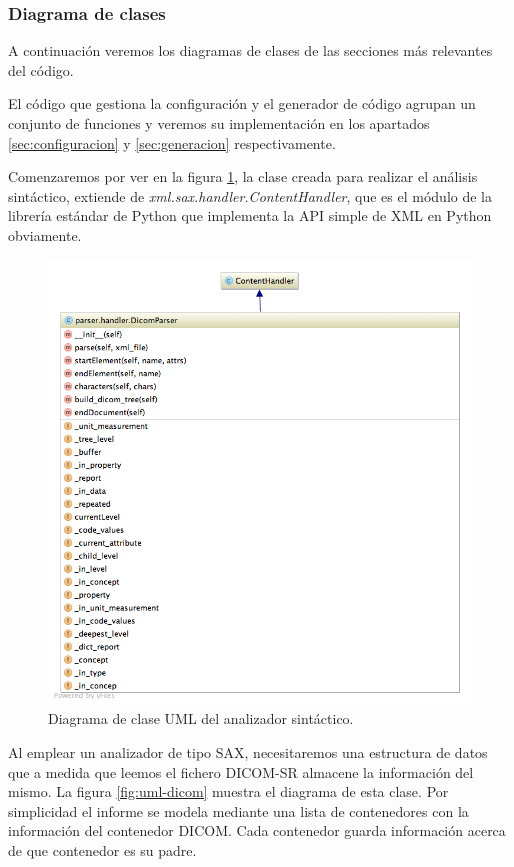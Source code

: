 \subsubsection{Diagrama de clases}
A continuación veremos los diagramas de clases de las secciones más relevantes del código.\par
El código que gestiona la configuración y el generador de código agrupan un conjunto de funciones y veremos su implementación en los apartados \ref{sec:configuracion} y \ref{sec:generacion} respectivamente.\par
Comenzaremos por ver en la figura \ref{fig:uml-parser}, la clase creada para realizar el análisis sintáctico, extiende de \emph{xml.sax.handler.ContentHandler}, que es el módulo de la librería estándar de Python que implementa la API simple de XML en Python obviamente. \par

\begin{figure}[ht]
\centering
\includegraphics[scale=0.6]{./imgs/diagramasUML/parser.png}
\caption{Diagrama de clase UML del analizador sintáctico.}
\label{fig:uml-parser}
\end{figure}

Al emplear un analizador de tipo SAX, necesitaremos una estructura de datos que a medida que leemos el fichero DICOM-SR almacene la información del mismo. La figura \ref{fig:uml-dicom} muestra el diagrama de esta clase. Por simplicidad el informe se modela mediante una lista de contenedores con la información del contenedor DICOM. Cada contenedor guarda información acerca de que contenedor es su padre. \par

